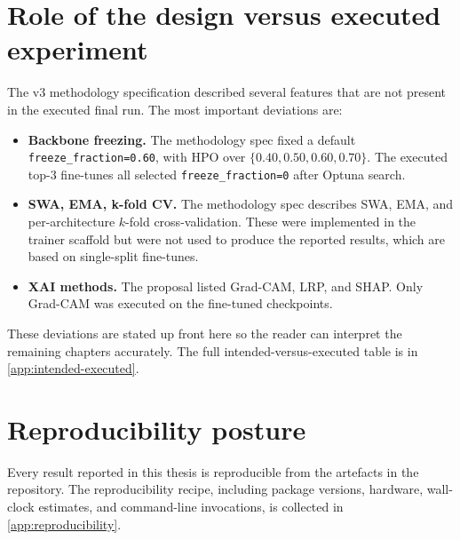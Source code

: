 \documentclass[../preamble.tex]{subfiles}
\begin{document}
\section{Role of the design versus executed experiment}
\label{sec:method-design-vs-run}

The v3 methodology specification described several features that are not
present in the executed final run. The most important deviations are:

\begin{itemize}
  \item \textbf{Backbone freezing.} The methodology spec fixed a default
        \texttt{freeze\_fraction=0.60}, with HPO over $\{0.40, 0.50, 0.60,
        0.70\}$. The executed top-3 fine-tunes all selected
        \texttt{freeze\_fraction=0} after Optuna search.
  \item \textbf{SWA, EMA, k-fold CV.} The methodology spec describes SWA,
        EMA, and per-architecture $k$-fold cross-validation. These were
        implemented in the trainer scaffold but were not used to produce the
        reported results, which are based on single-split fine-tunes.
  \item \textbf{XAI methods.} The proposal listed Grad-CAM, LRP, and SHAP.
        Only Grad-CAM was executed on the fine-tuned checkpoints.
\end{itemize}

These deviations are stated up front here so the reader can interpret the
remaining chapters accurately. The full intended-versus-executed table is in
\cref{app:intended-executed}.

\section{Reproducibility posture}
\label{sec:method-repro}

Every result reported in this thesis is reproducible from the artefacts in
the repository. The reproducibility recipe, including package versions,
hardware, wall-clock estimates, and command-line invocations, is collected
in \cref{app:reproducibility}.
\end{document}
